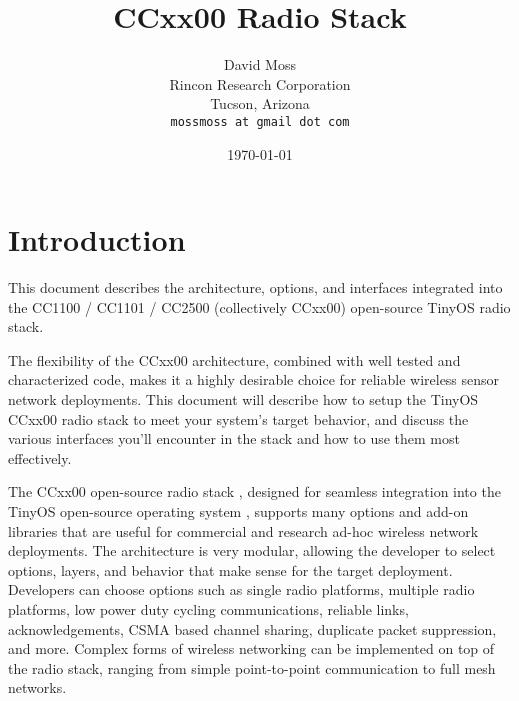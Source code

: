 \documentclass{article}
\begin{document}
\title{CCxx00 Radio Stack}
\author{David Moss\\
        Rincon Research Corporation\\
		Tucson, Arizona\\
		\texttt{mossmoss at gmail dot com}}  %
\date{\today}  %
\maketitle

\pagebreak
\tableofcontents
\pagebreak


\section{Introduction}
\label{sec:introduction}

This document describes the architecture, options, and interfaces integrated
into the CC1100 / CC1101 / CC2500 (collectively CCxx00) open-source TinyOS radio stack.

The flexibility of the CCxx00 architecture, combined with well tested and characterized code, makes 
it a highly desirable choice for reliable wireless sensor network deployments.  This document
will describe how to setup the TinyOS CCxx00 radio stack to meet your system's target behavior, and
discuss the various interfaces you'll encounter in the stack and how to use them most effectively.

The CCxx00 open-source radio stack \cite{opensourceccxx00}, designed for seamless integration into the TinyOS open-source
operating system \cite{tinyos}, supports many options and add-on libraries that are useful for commercial and 
research ad-hoc wireless network deployments.  The architecture is very modular, allowing the 
developer to select options, layers, and behavior that make sense for the target deployment. 
Developers can choose options such as single radio platforms, multiple radio platforms, low 
power duty cycling communications, reliable links, acknowledgements, CSMA based channel sharing, 
duplicate packet suppression, and more. Complex forms of wireless networking can be implemented on
top of the radio stack, ranging from simple point-to-point communication to full mesh networks.


\end{document}
